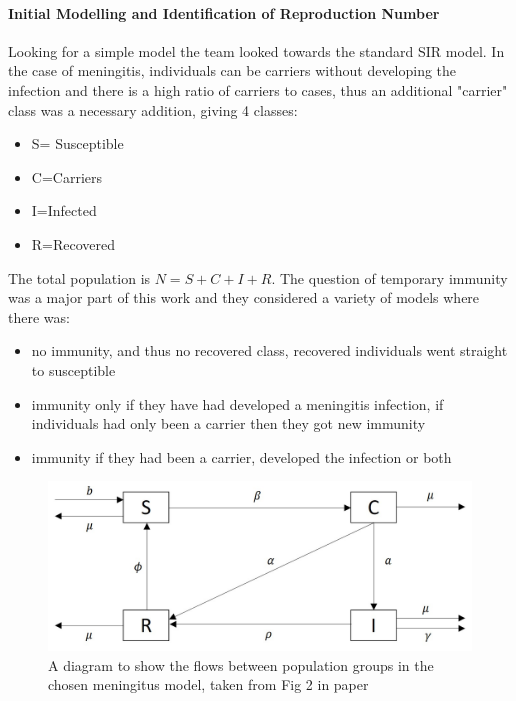 \documentclass[11pt]{article} %
\begin{document}
\paragraph{Initial Modelling and Identification of Reproduction Number  }
Looking for a simple model the team looked towards the standard SIR model. In the case of meningitis, individuals can be carriers without developing the infection and there is a high ratio of carriers to cases, thus an additional "carrier" class was a necessary addition, giving 4 classes: 
\begin{itemize}
	\item S= Susceptible
	\item C=Carriers
	\item I=Infected
	\item R=Recovered
\end{itemize}
The total population is $ N=S+C+I+R $. The question of temporary immunity was a major part of this work and they considered a variety of models where there was:
\begin{itemize}
	\item no immunity, and thus no recovered class, recovered individuals went straight  to susceptible 
	\item   immunity only if they have had developed a meningitis infection, if individuals had only been a carrier then they got new immunity
	\item immunity if they had been a carrier, developed the infection or both
\end{itemize}

\begin{figure}
	\centering
	\includegraphics[width=0.7\linewidth]{Report_images/meningitis_model}
	\caption{A diagram to show the flows between population groups in the chosen meningitus model, taken from Fig 2 in paper  \cite{Irving2012}}
	\label{fig:meningitismodel}
\end{figure}
\end{document}

